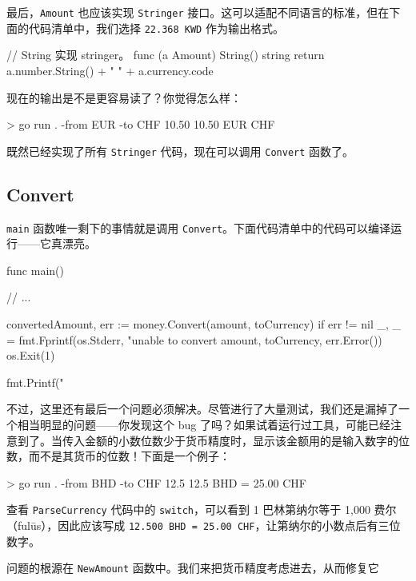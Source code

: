 最后，\texttt{Amount} 也应该实现 \texttt{Stringer} 接口。这可以适配不同语言的标准，但在下面的代码清单中，我们选择 \texttt{22.368 KWD} 作为输出格式。

\begin{gocode}[title={代码清单 6.31 \texttt{amount.go}：实现 \texttt{Amount} 的 \texttt{Stringer}}]
// String 实现 stringer。
func (a Amount) String() string {
    return a.number.String() + " " + a.currency.code
}
\end{gocode}

现在的输出是不是更容易读了？你觉得怎么样：

\begin{shellcode}[]
> go run . -from EUR -to CHF 10.50
10.50 EUR CHF
\end{shellcode}

既然已经实现了所有 \texttt{Stringer} 代码，现在可以调用 \texttt{Convert} 函数了。

\subsection{Convert}

\texttt{main} 函数唯一剩下的事情就是调用 \texttt{Convert}。下面代码清单中的代码可以编译运行——它真漂亮。

\begin{gocode}[title={代码清单 6.32 \texttt{main.go}：\texttt{main} 函数的结尾}]
func main() {
    // ...

    convertedAmount, err := money.Convert(amount, toCurrency)
    if err != nil {
        _, _ = fmt.Fprintf(os.Stderr,
            "unable to convert %
            amount, toCurrency, err.Error())
        os.Exit(1)
    }

    fmt.Printf("%
}
\end{gocode}

不过，这里还有最后一个问题必须解决。尽管进行了大量测试，我们还是漏掉了一个相当明显的问题——你发现这个 bug 了吗？如果试着运行过工具，可能已经注意到了。当传入金额的小数位数少于货币精度时，显示该金额用的是输入数字的位数，而不是其货币的位数！下面是一个例子：

\begin{shellcode}[]
> go run . -from BHD -to CHF 12.5
12.5 BHD = 25.00 CHF
\end{shellcode}

查看 \texttt{ParseCurrency} 代码中的 \texttt{switch}，可以看到 1 巴林第纳尔等于 1,000 费尔（fulūs），因此应该写成 \texttt{12.500 BHD = 25.00 CHF}，让第纳尔的小数点后有三位数字。

问题的根源在 \texttt{NewAmount} 函数中。我们来把货币精度考虑进去，从而修复它
